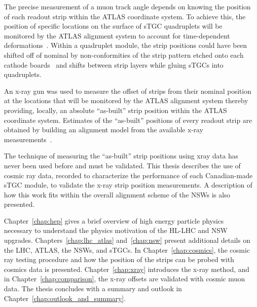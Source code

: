 The precise measurement of  a muon track angle depends on knowing the position of each readout strip within the  ATLAS coordinate system.  To achieve this, the position of specific locations on the surface of sTGC quadruplets will be monitored by the ATLAS alignment system to account for time-dependent deformations~\cite{nsw_tdr}. Within a quadruplet module, the strip positions could have been shifted off of nominal by non-conformities of the strip pattern etched onto each cathode boards~\cite{carlson_results_2019} and shifts between strip layers while gluing sTGCs into quadruplets.

An x-ray gun was used to measure the offset of strips from their nominal position at the locations that will be monitored by the ATLAS alignment system thereby providing, locally, an absolute “as-built” strip position within the ATLAS coordinate system.  Estimates of the ``as-built'' positions of every readout strip are obtained by building an alignment model from the available x-ray measurements~\cite{lefebvre_precision_2020}.

The technique of measuring the ``as-built'' strip positions using xray data has never been used before and must be validated. This thesis describes the use of cosmic ray data, recorded to characterize the performance of each Canadian-made sTGC module, to validate the x-ray strip position measurements.  A description of how this work fits within the overall alignment scheme of the NSWs is also presented. 

Chapter~\ref{chap:hep} gives a brief overview of high energy particle physics necessary to understand the physics motivation of the HL-LHC and NSW upgrades. Chapters~\ref{chap:lhc_atlas} and~\ref{chap:nsw} present additional details on the LHC, ATLAS, the NSWs, and sTGCs. In Chapter~\ref{chap:cosmics}, the cosmic ray testing procedure and how the position of the strips can be probed with cosmics data is presented. Chapter~\ref{chap:xray} introduces the x-ray method, and in Chapter~\ref{chap:comparison}, the x-ray offsets are validated with cosmic muon data. The thesis concludes with a summary and outlook in Chapter~\ref{chap:outlook_and_summary}.

